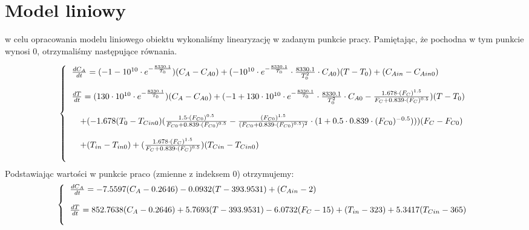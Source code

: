 \chapter{Model liniowy}
w celu opracowania modelu liniowego obiektu wykonaliśmy linearyzację w zadanym punkcie pracy. Pamiętając, że pochodna w tym punkcie wynosi 0, otrzymaliśmy następujące równania.

\begin{equation}
\left\{
\begin{tabular}{l}
$\frac{dC_A}{dt} = (-1-10^{10}\cdot e^{-\frac{8330.1}{T_0}})(C_A-C_{A0})+(-10^{10}\cdot e^{-\frac{8330.1}{T_0}}\cdot \frac{8330.1}{T_0^2}\cdot C_{A0})(T-T_0)+(C_{Ain}-C_{Ain0})$\\\\
$\frac{dT}{dt} = (130\cdot 10^{10}\cdot e^{-\frac{8330.1}{T_0}})(C_A-C_{A0}) + (-1+130\cdot 10^{10}\cdot e^{-\frac{8330.1}{T_0}}\cdot \frac{8330.1}{T_0^2}\cdot C_{A0}-\frac{1.678\cdot (F_C)^{1.5}}{F_C+0.839\cdot (F_C)^{0.5}})(T-T_0)$\\\\
$\quad + (-1.678(T_0-T_{Cin0})(\frac{1.5\cdot (F_{C0})^{0.5}}{F_{C0}+0.839\cdot (F_{C0})^{0.5}}-\frac{ (F_{C0})^{1.5}}{(F_{C0}+0.839\cdot (F_{C0})^{0.5})^2}\cdot (1+0.5\cdot 0.839 \cdot (F_{C0})^{-0.5})))(F_C-F_{C0})$\\\\
$\quad + (T_{in} - T_{in0}) + (\frac{1.678\cdot (F_C)^{1.5}}{F_C+0.839\cdot (F_C)^{0.5}})(T_{Cin} - T_{Cin0})$\\\\
\end{tabular}
\right.
\end{equation}
Podstawiając wartości w punkcie praco (zmienne z indeksem 0) otrzymujemy:
\begin{equation}
\left\{
\begin{tabular}{l}
$\frac{dC_A}{dt} = -7.5597(C_A-0.2646)-0.0932(T-393.9531)+(C_{Ain}-2)$\\\\
$\frac{dT}{dt} = 852.7638(C_A-0.2646) + 5.7693(T-393.9531) -6.0732(F_C-15) + (T_{in} - 323) + 5.3417(T_{Cin} - 365)$\\\\
\end{tabular}
\right.
\end{equation}

